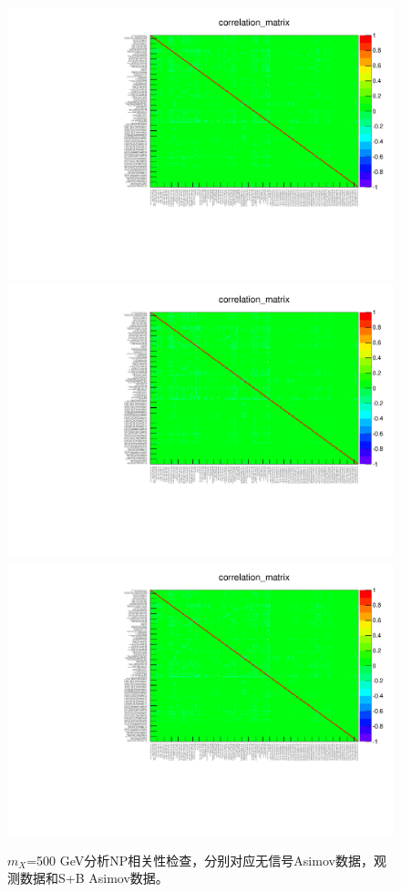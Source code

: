 \begin{figure}
\centering
\includegraphics[width=.35\textwidth, angle=-90]{fig/Statistical/combination/corr-exp-combined-mH500.pdf}
\includegraphics[width=.35\textwidth, angle=-90]{fig/Statistical/combination/corr-obs-combined-mH500.pdf}\\
\includegraphics[width=.35\textwidth, angle=-90]{fig/Statistical/combination/corr-exp-combined-mH500_mu1.pdf}
\caption{$m_X$=500 GeV分析NP相关性检查，分别对应无信号Asimov数据，观测数据和S+B Asimov数据。}
\label{fig:corr-comb-500}
\end{figure}

